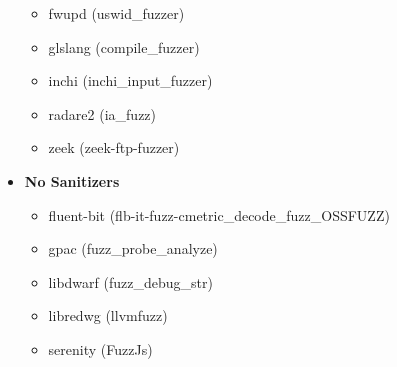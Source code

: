 \begin{itemize}
\begin{itemize}
    \item fwupd (uswid\_fuzzer)
    \item glslang (compile\_fuzzer)
    \item inchi (inchi\_input\_fuzzer)
    \item radare2 (ia\_fuzz)
    \item zeek (zeek-ftp-fuzzer)
  \end{itemize}
  \item \textbf{No Sanitizers}
  \begin{itemize}
    \item fluent-bit (flb-it-fuzz-cmetric\_decode\_fuzz\_OSSFUZZ)
    \item gpac (fuzz\_probe\_analyze)
    \item libdwarf (fuzz\_debug\_str)
    \item libredwg (llvmfuzz)
    \item serenity (FuzzJs)
  \end{itemize}
\end{itemize}








\newpage
